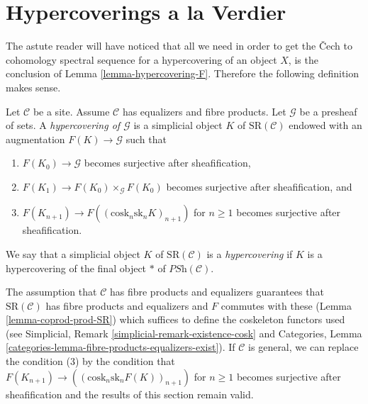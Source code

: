 \section{Hypercoverings a la Verdier}
\label{section-hypercoverings-verdier}

\noindent
The astute reader will have noticed that all we need in order
to get the {\v C}ech to cohomology spectral sequence for a
hypercovering of an object $X$, is the
conclusion of Lemma \ref{lemma-hypercovering-F}.
Therefore the following definition makes sense.

\begin{definition}
\label{definition-hypercovering-variant}
Let $\mathcal{C}$ be a site. Assume $\mathcal{C}$ has equalizers
and fibre products. Let $\mathcal{G}$ be a presheaf of sets.
A {\it hypercovering of $\mathcal{G}$} is a simplicial object
$K$ of $\text{SR}(\mathcal{C})$ endowed with an augmentation
$F(K) \to \mathcal{G}$ such that
\begin{enumerate}
\item $F(K_0) \to \mathcal{G}$ becomes surjective
after sheafification,
\item $F(K_1) \to F(K_0) \times_\mathcal{G} F(K_0)$
becomes surjective after sheafification, and
\item $F(K_{n + 1}) \longrightarrow F((\text{cosk}_n \text{sk}_n K)_{n + 1})$
for $n \geq 1$ becomes surjective after sheafification.
\end{enumerate}
We say that a simplicial object $K$ of $\text{SR}(\mathcal{C})$
is a {\it hypercovering} if $K$ is a hypercovering of the final
object $*$ of $\textit{PSh}(\mathcal{C})$.
\end{definition}

\noindent
The assumption that $\mathcal{C}$ has fibre products and equalizers
guarantees that $\text{SR}(\mathcal{C})$ has fibre products
and equalizers and $F$ commutes with these
(Lemma \ref{lemma-coprod-prod-SR}) which suffices
to define the coskeleton functors used (see
Simplicial, Remark \ref{simplicial-remark-existence-cosk} and
Categories, Lemma \ref{categories-lemma-fibre-products-equalizers-exist}).
If $\mathcal{C}$ is general, we can replace the condition (3) by the
condition that
$F(K_{n + 1}) \longrightarrow ((\text{cosk}_n \text{sk}_n F(K))_{n + 1})$
for $n \geq 1$ becomes surjective after sheafification and the
results of this section remain valid.

